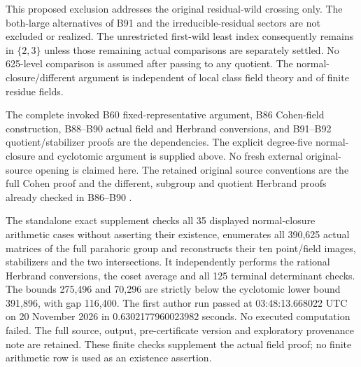 \begin{remark}
\label{rem:B-RD93-scope}
This proposed exclusion addresses the original residual-wild
crossing only. The both-large alternatives of B91 and the
irreducible-residual sectors are not excluded or realized.
The unrestricted first-wild least index consequently remains
in \(\{2,3\}\) unless those remaining actual comparisons are
separately settled. No 625-level comparison is assumed after
passing to any quotient. The normal-closure/different argument
is independent of local class field theory and of finite
residue fields.

The complete invoked B60 fixed-representative argument,
B86 Cohen-field construction, B88--B90 actual field and
Herbrand conversions, and B91--B92 quotient/stabilizer proofs
are the dependencies. The explicit degree-five normal-closure
and cyclotomic argument is supplied above. No fresh external
original-source opening is claimed here. The retained original
source conventions are the full Cohen proof and the different,
subgroup and quotient Herbrand proofs already checked in B86--B90
\cite{Stacks032A,ColmezCorpsLocaux}.

The standalone exact supplement
checks all 35 displayed normal-closure arithmetic cases without
asserting their existence, enumerates all 390,625 actual matrices
of the full parahoric group and reconstructs their ten point/field
images, stabilizers and the two intersections. It independently
performs the rational Herbrand conversions, the coset average and
all 125 terminal determinant checks. The bounds 275,496 and
70,296 are strictly below the cyclotomic lower bound 391,896,
with gap 116,400. The first author run passed at
03:48:13.668022 UTC on 20 November 2026 in
0.6302177960023982 seconds. No executed computation failed.
The full source, output, pre-certificate version and exploratory
provenance note are retained. These finite checks supplement the
actual field proof; no finite arithmetic row is used as an
existence assertion.
\end{remark}
